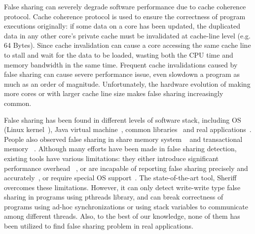 
\label{sec:intro} 
False sharing can severely degrade software performance due to cache coherence protocol.
Cache coherence protocol is used to ensure the correctness of
program executions originally: 
if some data on a core has been updated, the duplicated data in any other core's private 
cache must be invalidated at cache-line level (e.g. 64 Bytes). 
Since cache invalidation can cause a core accessing the same cache line 
to stall and wait for the data to be loaded, 
wasting both the CPU time and memory bandwidth in the same time. 
Frequent cache invalidations caused by false sharing 
can cause severe performance issue, even slowdown a program as much as an order of magnitude.
Unfortunately, the hardware evolution of making more cores
or with larger cache line size makes false sharing increasingly common.

False sharing has been found in different levels of software stack, including
OS (Linux kernel~\cite{OSfalsesharing}), Java virtual machine~\cite{JVMfalsesharing}, 
common libraries~\cite{libfalsesharing} and real applications~\cite{appfalsesharing, mysql}. 
People also observed false sharing in share memory system
~\cite{dsmfalsesharing} and transactional memory ~\cite{tmfalsesharing}.
Although many efforts have been made in false sharing detection, existing
tools have various limitations:
they either introduce significant performance overhead~
\cite{falseshare:simulator, falseshare:binaryinstrumentation1,falseshare:binaryinstrumentation2}, or 
are incapable of reporting false sharing 
precisely and accurately~\cite{qinzhaodetection, detect:ptu, detect:intel, falseshare:binaryinstrumentation1, DProf, falseshare:binaryinstrumentation2}, 
or require special OS support~\cite{OSdetection}.
The state-of-the-art tool, Sheriff~\cite{sheriff} overcomes these limitations. However, 
it can only detect write-write type false sharing in programs using pthreads library,
and can break correctness of programs using ad-hoc synchronizations or using stack variables to 
communicate among different threads. Also, to the best of our knowledge, none of them has been 
utilized to find false sharing problem in real applications.


